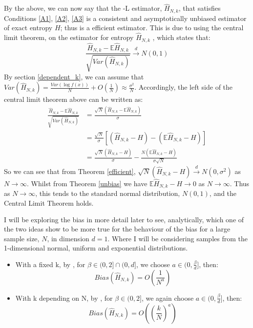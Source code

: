 \documentclass[12pt]{report}
\begin{document}
By the above, we can now say that the -L estimator, $\hat{H}_{N, k}$, that satisfies Conditions \ref{A1}, \ref{A2}, \ref{A3} is a consistent and asymptotically unbiased estimator of exact entropy $H$; thus is a efficient estimator. This is due to using the central limit theorem, on the estimator for entropy $\hat{H}_{N, k}$ \cite{paper6}, which states that:
\begin{equation}
\frac{\hat{H}_{N, k} - \mathbb{E}{\hat{H}_{N, k}}}{\sqrt{Var(\hat{H}_{N, k})}} \xrightarrow{d} N(0, 1) \nonumber
\end{equation}
By section \ref{dependent_k}, we can assume that $Var(\hat{H}_{N, k}) = \frac{Var(\log f(x))}{N} + O(\frac{1}{N}) \approx \frac{\sigma^2}{N}$. Accordingly, the left side of the central limit theorem above can be written as:
\begin{align*}
\frac{\hat{H}_{N, k} - \mathbb{E}{\hat{H}_{N, k}}}{\sqrt{Var(\hat{H}_{N, k})}} &= \frac{\sqrt{N}(\hat{H}_{N, k} - \mathbb{E}{\hat{H}_{N, k}})}{\sigma} \\
&= \frac{\sqrt{N}}{\sigma}[(\hat{H}_{N, k} - H) - (\mathbb{E}{\hat{H}_{N, k}} - H)] \\
&= \frac{\sqrt{N}(\hat{H}_{N, k} - H)}{\sigma} - \frac{N(\mathbb{E}{\hat{H}_{N, k}} - H)}{\sigma \sqrt{N}}
\end{align*}
So we can see that from Theorem \ref{efficient}, $\sqrt{N}(\hat{H}_{N, k} - H) \xrightarrow{d} N(0, \sigma^2)$ as $N \to \infty$. Whilst from Theorem \ref{unbias} we have $\mathbb{E}{\hat{H}_{N, k}} - H  \to 0$ as $N \to \infty$. Thus as $N \to \infty$, this tends to the standard normal distribution, $N(0, 1)$, and the Central Limit Theorem holds.

I will be exploring the bias in more detail later to see, analytically, which one of the two ideas show to be more true for the behaviour of the bias for a large sample size, $N$, in dimension $d=1$. Where I will be considering samples from the 1-dimensional normal, uniform and exponential distributions. 
\begin{itemize}
\item With a fixed k, by \cite{paper3}, for $\beta \in (0, 2] \cap (0, d]$, we choose $a \in (0, \frac{\beta}{d} ]$, then:
\begin{equation} \label{fixedkbias}
Bias(\hat{H}_{N, k})= O \left( \frac{1}{N^{a}} \right)
\end{equation}

\item With k depending on N, by \cite{paper4}, for $\beta \in (0, 2]$, we again choose $a \in (0, \frac{\beta}{d} ]$, then:
 \begin{equation} \label{dependentkbias}
Bias(\hat{H}_{N, k}) = O\left( \left( \frac{k}{N} \right)^{a} \right)
\end{equation}
\end{itemize}
\end{document}

